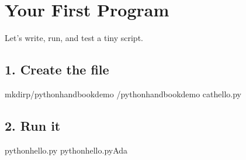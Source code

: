 \documentclass[a4paper,11pt,english]{sphinxmanual}
\begin{document}
\section{Your First Program}
\label{\detokenize{getting_started/first_program:your-first-program}}\label{\detokenize{getting_started/first_program::doc}}
\sphinxAtStartPar
Let’s write, run, and test a tiny script.


\subsection{1. Create the file}
\label{\detokenize{getting_started/first_program:create-the-file}}
\begin{sphinxVerbatim}[commandchars=\\\{\}]
mkdir\PYGZhy{}p\PYGZti{}/python\PYGZus{}handbook\PYGZus{}demo
\PYGZti{}/python\PYGZus{}handbook\PYGZus{}demo
cat\PYGZgt{}hello.py





\end{sphinxVerbatim}


\subsection{2. Run it}
\label{\detokenize{getting_started/first_program:run-it}}
\begin{sphinxVerbatim}[commandchars=\\\{\}]
pythonhello.py
pythonhello.pyAda
\end{sphinxVerbatim}
\end{document}
